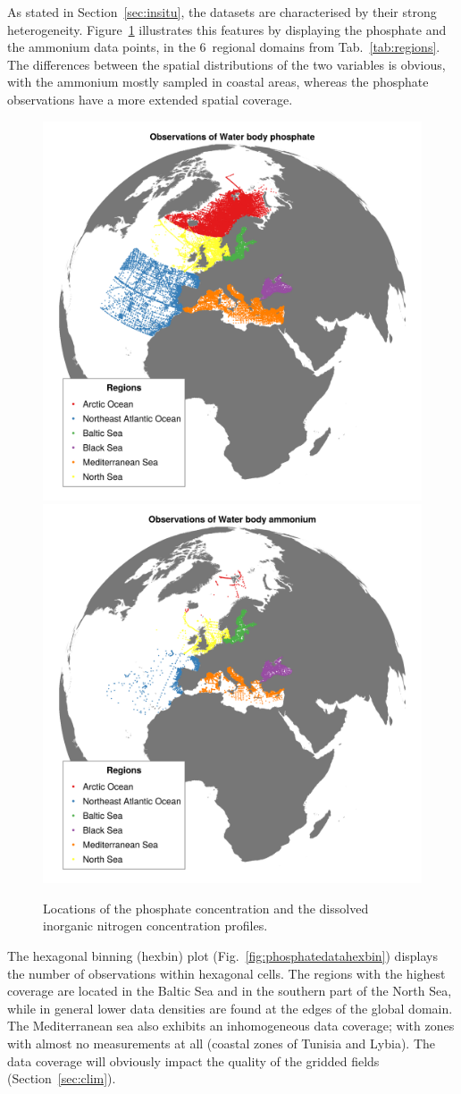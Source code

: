 \documentclass[essd, manuscript]{copernicus}
\begin{document}
As stated in Section~\ref{sec:insitu}, the datasets are characterised by their strong heterogeneity. Figure~\ref{fig:phosphatedata} illustrates this features by displaying the phosphate and the ammonium data points, in the 6~regional domains from Tab.~\ref{tab:regions}. The differences between the spatial distributions of the two variables is obvious, with the ammonium mostly sampled in coastal areas, whereas the phosphate observations have a more extended spatial coverage.

\begin{figure}[t]
\includegraphics[width=.49\textwidth]{observations_Water_body_phosphate.png}\includegraphics[width=.49\textwidth]{observations_Water_body_ammonium.png}
\caption{Locations of the phosphate concentration and the dissolved inorganic nitrogen concentration profiles.\label{fig:phosphatedata}}
\end{figure}

The hexagonal binning (hexbin) plot (Fig.~\ref{fig:phosphatedatahexbin}) displays the number of observations within hexagonal cells. The regions with the highest coverage are located in the Baltic Sea and in the southern part of the North Sea, while in general lower data densities are found at the edges of the global domain. The Mediterranean sea also exhibits an inhomogeneous data coverage; with zones with almost no measurements at all (coastal zones of Tunisia and Lybia). The data coverage will obviously impact the quality of the gridded fields (Section~\ref{sec:clim}).
\end{document}
